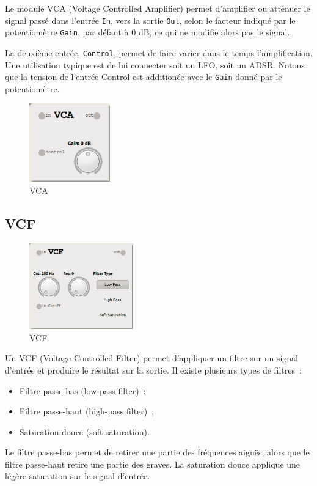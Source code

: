 \documentclass[a4paper,oneside,frenchb,10pt]{article}
\begin{document}
\begin{multicols}{2}
Le module VCA (Voltage Controlled Amplifier) permet d'amplifier ou
atténuer le signal passé dans l'entrée \verb!In!, vers la sortie
\verb!Out!, selon le facteur indiqué par le potentiomètre \verb!Gain!,
par défaut à 0 dB, ce qui ne modifie alors pas le signal.

La deuxième entrée, \verb!Control!, permet de faire varier dans le temps
l'amplification. Une utilisation typique est de lui connecter soit un
LFO, soit un ADSR. Notons que la tension de l'entrée Control est
additionée avec le \verb!Gain! donné par le potentiomètre.

\begin{figure}[H]
\centering
\includegraphics[width=3.5cm]{../img/png/vca.png}
\caption{VCA}
\end{figure}
\end{multicols}

\subsection{VCF}

\begin{multicols}{2}
\begin{figure}[H]
\centering
\includegraphics[width=4.5cm]{../img/png/vcf.png}
\caption{VCF}
\end{figure}

Un VCF (Voltage Controlled Filter) permet d'appliquer un filtre sur un
signal d'entrée et produire le résultat sur la sortie. Il existe
plusieurs types de filtres~:

\begin{itemize}
\item
  Filtre passe-bas (low-pass filter)~;
\item
  Filtre passe-haut (high-pass filter)~;
\item
  Saturation douce (soft saturation).
\end{itemize}

Le filtre passe-bas permet de retirer une partie des fréquences aiguës,
alors que le filtre passe-haut retire une partie des graves. La
saturation douce applique une légère saturation sur le signal d'entrée.
\end{multicols}
\end{document}
